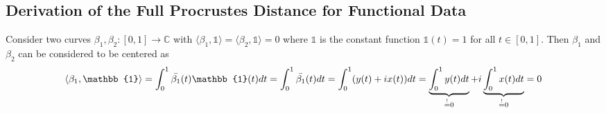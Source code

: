 \subsection{Derivation of the Full Procrustes Distance for Functional Data}
\label{app:deriv-full-proc-dist}
Consider two curves $\beta_1, \beta_2 : [0,1] \rightarrow \mathbb{C}$ with $\langle \beta_1, \mathbb{1} \rangle = \langle \beta_2, \mathbb{1} \rangle = 0$ where $\mathbb{1}$ is the constant function $\mathbb{1}(t) = 1$ for all $t \in [0,1]$.
Then $\beta_1$ and $\beta_2$ can be considered to be centered as
$$ \langle \beta_1, \mathbb{1} \rangle
= \int_0^1 \bar{\beta_1}(t)\mathbb{1}(t)dt\\
= \int_0^1 \bar{\beta_1}(t)dt
= \int_0^1 (y(t) + i x(t))dt
= \underbrace{\int_0^1 y(t)dt}_{\stackrel{!}{=}0} + i \underbrace{\int_0^1 x(t)dt}_{\stackrel{!}{=}0} = 0 $$

